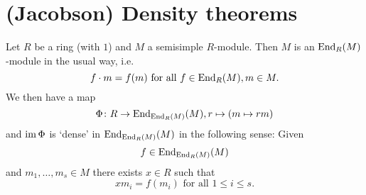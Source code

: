 \section{(Jacobson) Density theorems}


\begin{thrm}
  Let $R$ be a ring (with $1$) and $M$ a semisimple $R$-module.
  Then $M$ is an $\operatorname{End}_R(M)$-module in the usual way, i.e.\
  \[
      f \cdot m
    = f(m)
    \text{ for all }
    f \in \operatorname{End}_R(M),
    m \in M.
  \]
  We then have a map
  \[
            \Phi
    \colon  R
    \to     \operatorname{End}_{\operatorname{End}_R(M)}(M),
            r
    \mapsto (m \mapsto rm)
  \]
  and $\operatorname{im} \Phi$ is `dense' in $\operatorname{End}_{\operatorname{End}_R(M)}(M)$ in the following sense:
  Given
  \[
    f \in \operatorname{End}_{\operatorname{End}_R(M)}(M)
  \]
  and $m_1, \dotsc, m_s \in M$ there exists $x \in R$ such that
  \[
      x m_i
    = f(m_i)
    \text{ for all }
    1 \leq i \leq s.
  \]
\end{thrm}
